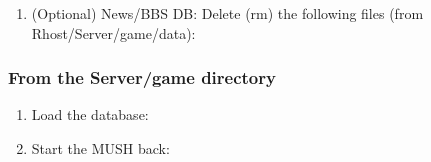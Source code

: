 \documentclass[letterpaper,10pt,english]{sphinxmanual}
\begin{document}
\begin{enumerate}
\begin{sphinxVerbatim}[commandchars=\\\{\}]
\end{sphinxVerbatim}

\item {} 
\sphinxAtStartPar
(Optional) News/BBS DB: Delete (rm) the following files (from Rhost/Server/game/data):

\begin{sphinxVerbatim}[commandchars=\\\{\}]
\end{sphinxVerbatim}

\end{enumerate}


\subsubsection{From the Server/game directory}
\label{\detokenize{legacy:from-the-server-game-directory}}\begin{enumerate}
%
\item {} 
\sphinxAtStartPar
Load the database:

\begin{sphinxVerbatim}[commandchars=\\\{\}]
   
\end{sphinxVerbatim}

\item {} 
\sphinxAtStartPar
Start the MUSH back:

\begin{sphinxVerbatim}[commandchars=\\\{\}]
\end{sphinxVerbatim}

\end{enumerate}
\end{document}
